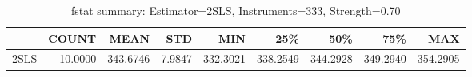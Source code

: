 \begin{table}[ht]
\centering
\caption{fstat summary: Estimator=2SLS, Instruments=333, Strength=0.70}
\begin{tabular}{lrrrrrrrr}
\toprule
 & COUNT & MEAN & STD & MIN & 25\% & 50\% & 75\% & MAX \\
\midrule
2SLS & 10.0000 & 343.6746 & 7.9847 & 332.3021 & 338.2549 & 344.2928 & 349.2940 & 354.2905 \\
\bottomrule
\end{tabular}
\end{table}
